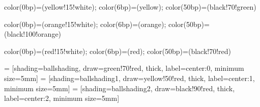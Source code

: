 {color(0bp)=(yellow!15!white);
color(6bp)=(yellow);
color(50bp)=(black!70!green)
}

{color(0bp)=(orange!15!white);
color(6bp)=(orange);
color(50bp)=(black!100!orange)
}

{color(0bp)=(red!15!white);
color(6bp)=(red);
color(50bp)=(black!70!red)
}

 = [shading=ballshading, draw=green!70!red, thick, label={center:0}, minimum size=5mm]
 = [shading=ballshading1, draw=yellow!50!red, thick, label={center:1}, minimum size=5mm]
 = [shading=ballshading2, draw=black!90!red, thick, label={center:2}, minimum size=5mm]

